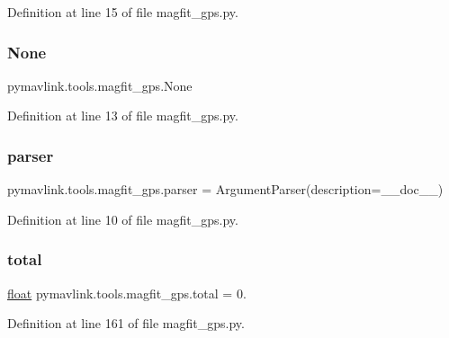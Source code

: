 Definition at line 15 of file magfit\+\_\+gps.\+py.

\mbox{\label{namespacepymavlink_1_1tools_1_1magfit__gps_a7cc8f3ed5e508a097ae250f70d8cf307}} 
\subsubsection{\texorpdfstring{None}{None}}
{\footnotesize\ttfamily pymavlink.\+tools.\+magfit\+\_\+gps.\+None}



Definition at line 13 of file magfit\+\_\+gps.\+py.

\mbox{\label{namespacepymavlink_1_1tools_1_1magfit__gps_ab6b7e52bfb62d8f23156f6943dc01d1a}} 
\subsubsection{\texorpdfstring{parser}{parser}}
{\footnotesize\ttfamily pymavlink.\+tools.\+magfit\+\_\+gps.\+parser = Argument\+Parser(description=\+\_\+\+\_\+doc\+\_\+\+\_\+)}



Definition at line 10 of file magfit\+\_\+gps.\+py.

\mbox{\label{namespacepymavlink_1_1tools_1_1magfit__gps_a1e7c162e0833dfd689228f0efe1766c1}} 
\subsubsection{\texorpdfstring{total}{total}}
{\footnotesize\ttfamily \mbox{\hyperlink{namespacepymavlink_1_1tools_1_1magfit__gps_ad7c096438beeb93459cb78fc9c7838e4}{float}} pymavlink.\+tools.\+magfit\+\_\+gps.\+total = 0.}



Definition at line 161 of file magfit\+\_\+gps.\+py.

